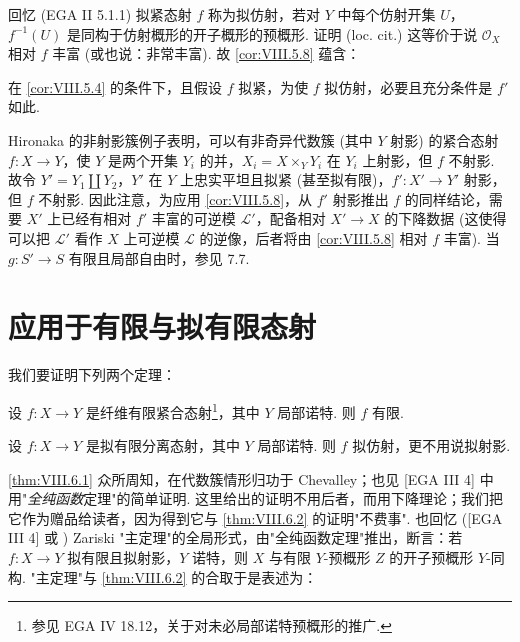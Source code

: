 回忆 (EGA II 5.1.1) 拟紧态射 $f$ 称为拟仿射，若对 $Y$ 中每个仿射开集 $U$，$f^{-1}(U)$ 是同构于仿射概形的开子概形的预概形. 证明 (loc. cit.) 这等价于说 $\mathcal{O}_X$ 相对 $f$ 丰富 (或也说：非常丰富). 故 \ref{cor:VIII.5.8} 蕴含：

\begin{corollary}\label{cor:VIII.5.9}
在 \ref{cor:VIII.5.4} 的条件下，且假设 $f$ 拟紧，为使 $f$ 拟仿射，必要且充分条件是 $f'$ 如此.
\end{corollary}

\begin{remark}\label{rem:VIII.5.10}
Hironaka 的非射影簇例子表明，可以有非奇异代数簇 (其中 $Y$ 射影) 的紧合态射 $f \colon X \to Y$，使 $Y$ 是两个开集 $Y_i$ 的并，$X_i = X \times_Y Y_i$ 在 $Y_i$ 上射影，但 $f$ 不射影. 故令 $Y' = Y_1 \amalg Y_2$，$Y'$ 在 $Y$ 上忠实平坦且拟紧 (甚至拟有限)，$f' \colon X' \to Y'$ 射影，但 $f$ 不射影. 因此注意，为应用 \ref{cor:VIII.5.8}，从 $f'$ 射影推出 $f$ 的同样结论，需要 $X'$ 上已经有相对 $f'$ 丰富的可逆模 $\mathcal{L}'$，配备相对 $X' \to X$ 的下降数据 (这使得可以把 $\mathcal{L}'$ 看作 $X$ 上可逆模 $\mathcal{L}$ 的逆像，后者将由 \ref{cor:VIII.5.8} 相对 $f$ 丰富). 当 $g \colon S' \to S$ 有限且局部自由时，参见 7.7.
\end{remark}

\section{应用于有限与拟有限态射}

我们要证明下列两个定理：

\begin{theorem}\label{thm:VIII.6.1}
设 $f \colon X \to Y$ 是纤维有限紧合态射\footnote{参见 EGA IV 18.12，关于对未必局部诺特预概形的推广.}，其中 $Y$ 局部诺特. 则 $f$ 有限.
\end{theorem}

\begin{theorem}\label{thm:VIII.6.2}
设 $f \colon X \to Y$ 是拟有限分离态射，其中 $Y$ 局部诺特. 则 $f$ 拟仿射，更不用说拟射影.
\end{theorem}

\begin{remark}\label{rem:VIII.6.3}
\cref{thm:VIII.6.1} 众所周知，在代数簇情形归功于 Chevalley；也见 [EGA III 4] 中用"\emph{全纯函数}定理"的简单证明. 这里给出的证明不用后者，而用下降理论；我们把它作为赠品给读者，因为得到它与 \ref{thm:VIII.6.2} 的证明"不费事". 也回忆 ([EGA III 4] 或 \cite{exp08-1}) Zariski "主定理"的全局形式，由"全纯函数定理"推出，断言：若 $f \colon X \to Y$ 拟有限且拟射影，$Y$ 诺特，则 $X$ 与有限 $Y$-预概形 $Z$ 的开子预概形 $Y$-同构. "主定理"与 \ref{thm:VIII.6.2} 的合取于是表述为：
\end{remark}

